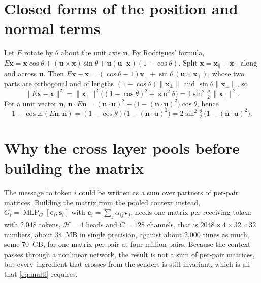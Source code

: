 \documentclass[11pt,a4paper]{article}
\theoremstyle{remark}
\newcommand{\x}{\mathbf{x}}
\newcommand{\n}{\mathbf{n}}
\newcommand{\norm}[1]{\lVert #1\rVert}
\DeclareMathOperator{\MLP}{MLP}
\begin{document}
\section{Closed forms of the position and normal terms}
\label{app:closed}
Let $E$ rotate by $\theta$ about the unit axis $\mathbf u$. By Rodrigues' formula,
$E\x=\x\cos\theta+(\mathbf u\times\x)\sin\theta+\mathbf u(\mathbf u\cdot\x)(1-\cos\theta)$.
Split $\x=\x_\parallel+\x_\perp$ along and across $\mathbf u$. Then $E\x-\x=(\cos\theta-1)\x_\perp+\sin\theta\,(\mathbf u\times\x_\perp)$, whose two parts are orthogonal and of lengths $(1-\cos\theta)\norm{\x_\perp}$ and $\sin\theta\norm{\x_\perp}$, so
\begin{equation}
  \norm{E\x-\x}^2=\norm{\x_\perp}^2\big((1-\cos\theta)^2+\sin^2\theta\big)=4\sin^2\tfrac\theta2\,\norm{\x_\perp}^2 .
\end{equation}
For a unit vector $\n$, $\n\cdot E\n=(\n\cdot\mathbf u)^2+\big(1-(\n\cdot\mathbf u)^2\big)\cos\theta$, hence
\begin{equation}
  1-\cos\angle(E\n,\n)=(1-\cos\theta)\big(1-(\n\cdot\mathbf u)^2\big)=2\sin^2\tfrac\theta2\,\big(1-(\n\cdot\mathbf u)^2\big).
\end{equation}

\section{Why the cross layer pools before building the matrix}
The message to token $i$ could be written as a sum over partners of per-pair matrices. Building the matrix from the pooled context instead, $G_i=\MLP_G[\mathbf c_i;\mathbf s_i]$ with $\mathbf c_i=\sum_j\alpha_{ij}\mathbf v_j$, needs one matrix per receiving token: with 2{,}048 tokens, $\mathcal H=4$ heads and $C=128$ channels, that is $2048\times4\times32\times32$ numbers, about 34~MB in single precision, against about 2{,}000 times as much, some 70~GB, for one matrix per pair at four million pairs. Because the context passes through a nonlinear network, the result is not a sum of per-pair matrices, but every ingredient that crosses from the senders is still invariant, which is all that \cref{eq:multi} requires.
\end{document}
